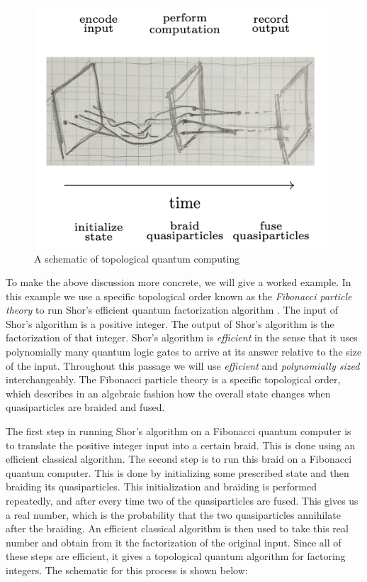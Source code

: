 \documentclass{article}
\theoremstyle{definition}
\numberwithin{figure}{section}
\begin{document}
\begin{figure}
\begin{center}
\includegraphics[scale=0.35]{TQC-outline}
\caption{A schematic of topological quantum computing}
\label{fig:TQC-outline}
\end{center}
\end{figure}

To make the above discussion more concrete, we will give a worked example. In this example we use a specific topological order known as the \textit{Fibonacci particle theory} to run Shor’s efficient quantum factorization algorithm \cite{shor1994algorithms}. The input of Shor’s algorithm is a positive integer. The output of Shor’s algorithm is the factorization of that integer. Shor’s algorithm is \textit{efficient} in the sense that it uses polynomially many quantum logic gates to arrive at its answer relative to the size of the input. Throughout this passage we will use \textit{efficient} and \textit{polynomially sized} interchangeably. The Fibonacci particle theory is a specific topological order, which describes in an algebraic fashion how the overall state changes when quasiparticles are braided and fused.

The first step in running Shor’s algorithm on a Fibonacci quantum computer is to translate the positive integer input into a certain braid. This is done using an efficient classical algorithm. The second step is to run this braid on a Fibonacci quantum computer. This is done by initializing some prescribed state and then braiding its quasiparticles. This initialization and braiding is performed repeatedly, and after every time two of the quasiparticles are fused. This gives us a real number, which is the probability that the two quasiparticles annihilate after the braiding. An efficient classical algorithm is then used to take this real number and obtain from it the factorization of the original input. Since all of these steps are efficient, it gives a topological quantum algorithm for factoring integers. The schematic for this process is shown below:
\end{document}
